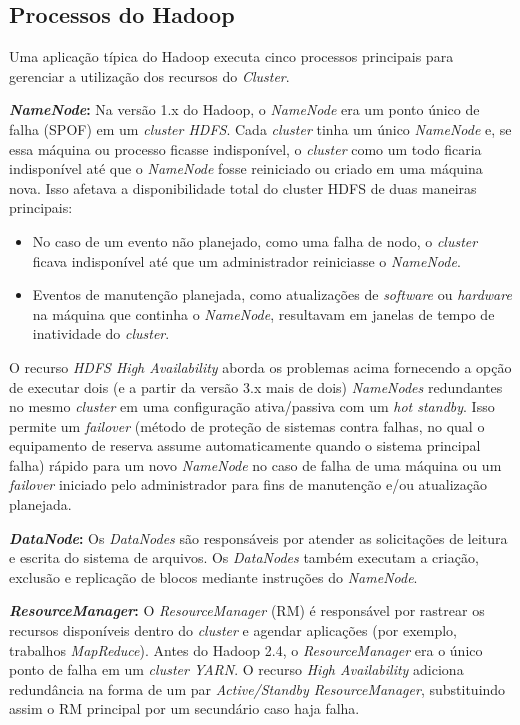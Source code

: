\subsection{Processos do Hadoop}

Uma aplicação típica do Hadoop executa cinco processos principais para gerenciar a utilização dos recursos do \emph{Cluster}.

\textbf{\emph{NameNode}:} Na versão 1.x do Hadoop, o \emph{NameNode} era um ponto único de falha (SPOF) em um \emph{cluster HDFS}. Cada \emph{cluster} tinha um único \emph{NameNode} e, se essa máquina ou processo ficasse indisponível, o \emph{cluster} como um todo ficaria indisponível até que o \emph{NameNode} fosse reiniciado ou criado em uma máquina nova. Isso afetava a disponibilidade total do cluster HDFS de duas maneiras principais:

\begin{itemize}

\item No caso de um evento não planejado, como uma falha de nodo, o \emph{cluster} ficava indisponível até que um administrador reiniciasse o \emph{NameNode}.

\item Eventos de manutenção planejada, como atualizações de \emph{software} ou \emph{hardware} na máquina que continha o \emph{NameNode}, resultavam em janelas de tempo de inatividade do \emph{cluster}.

\end{itemize}

O recurso \emph{HDFS High Availability} aborda os problemas acima fornecendo a opção de executar dois (e a partir da versão 3.x mais de dois) \emph{NameNodes} redundantes no mesmo \emph{cluster} em uma configuração ativa/passiva com um \emph{hot standby}. Isso permite um \emph{failover} (método de proteção de sistemas contra falhas, no qual o equipamento de reserva assume automaticamente quando o sistema principal falha) rápido para um novo \emph{NameNode} no caso de falha de uma máquina ou um \emph{failover} iniciado pelo administrador para fins de manutenção e/ou atualização planejada.
    
\textbf{\emph{DataNode}:} Os \emph{DataNodes} são responsáveis por atender as solicitações de leitura e escrita do sistema de arquivos. Os \emph{DataNodes} também executam a criação, exclusão e replicação de blocos mediante instruções do \emph{NameNode}.


\textbf{\emph{ResourceManager}:} O \emph{ResourceManager} (RM) é responsável por rastrear os recursos disponíveis dentro do \emph{cluster} e agendar aplicações (por exemplo, trabalhos \emph{MapReduce}). Antes do Hadoop 2.4, o \emph{ResourceManager} era o único ponto de falha em um \emph{cluster YARN}. O recurso \emph{High Availability} adiciona redundância na forma de um par \emph{Active/Standby ResourceManager}, substituindo assim o RM principal por um secundário caso haja falha.



